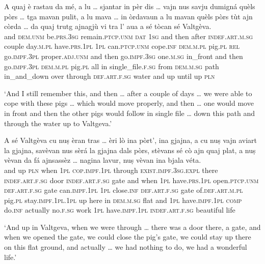 \begin{linenumbers}
	\gll    A quaj è rastau da mé, a lu … sjantar in pèr dis … vajn nus savju dumigná quèls pòrs … tga mavan pulit, a lu mava … in òrdavaun a lu mavan quèls pòrs tùt ajn còrda … da quaj trutg ajnagjù vi tra l' aua a sé tòcan sé Valtgèva.\\
	and \textsc{dem.unm} be.\textsc{prs.3sg} remain.\textsc{ptcp.unm}  \textsc{dat}  \textsc{1sg} and then {} after \textsc{indef.art.m.sg} couple  day.\textsc{m.pl} {} have.\textsc{prs.1pl} \textsc{1pl} can.\textsc{ptcp.unm} cope.\textsc{inf} \textsc{dem.m.pl} pig.\textsc{pl} {} \textsc{rel}  go.\textsc{impf.3pl} proper.\textsc{adj.unm} and then go.\textsc{impf.3sg} {} one.\textsc{m.sg} in\_front and then go.\textsc{impf.3pl} \textsc{dem.m.pl} pig.\textsc{pl} all in single\_file.\textsc{f.sg} {} from \textsc{dem.m.sg} path in\_and\_down over through \textsc{def.art.f.sg} water and up until up \textsc{pln} \\
\end{linenumbers}
\medskip
\glt `And I still remember this, and then … after a couple of days … we were able to cope with these pigs … which would move properly, and then … one would move in front and then the other pigs would follow in single file … down this path and through the water up to Valtgeva.'
\medskip

\begin{linenumbers}
	\gll    A sé Valtgèva cu nuṣ èran tras … èri lò ina pòrt’, ina gjajna, a cu nuṣ vajn aviart la gjajna, savèvan nus sèrá la gjajna dals pòrs, stèvans sé cò ajn quaj plat, a nuṣ vèvan da fá ajnsassèz … nagina lavur, nuṣ vèvan ina bjala véta.\\
	and up \textsc{pln} when \textsc{1pl} \textsc{cop.impf.1pl} through {} \textsc{exist.impf.3sg.expl} there \textsc{indef.art.f.sg} door \textsc{indef.art.f.sg} gate and when \textsc{1pl} have.\textsc{prs.1pl}  open.\textsc{ptcp.unm}  \textsc{def.art.f.sg} gate can.\textsc{impf.1pl}  \textsc{1pl}  close.\textsc{inf}  \textsc{def.art.f.sg} gate of.\textsc{def.art.m.pl} pig.\textsc{pl} stay.\textsc{impf.1pl.1pl} up here in \textsc{dem.m.sg} flat and \textsc{1pl} have.\textsc{impf.1pl} \textsc{comp}  do.\textsc{inf} actually {} no.\textsc{f.sg} work \textsc{1pl} have.\textsc{impf.1pl} \textsc{indef.art.f.sg} beautiful life\\
\end{linenumbers}
\medskip
\glt `And up in Valtgeva, when we were through … there was a door there, a gate, and when we opened the gate, we could close the pig’s gate, we could stay up there on this flat ground, and actually … we had nothing to do, we had a wonderful life.'
\medskip

